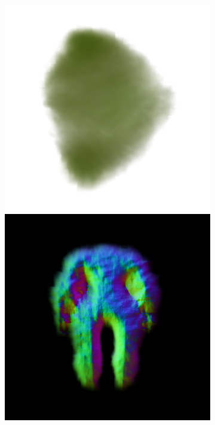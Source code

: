 \begin{figure}[ht]
\begin{subfigure}[b]{0.222\textwidth}
        \includegraphics[width=\textwidth]{etc/a robot made out of plants/magic123/magic123_coarse_robot_right_0_part1.png}
        \includegraphics[width=\textwidth]{etc/a robot made out of plants/magic123/magic123_coarse_robot_back_0_part2.png}

\end{subfigure}
\end{figure}
